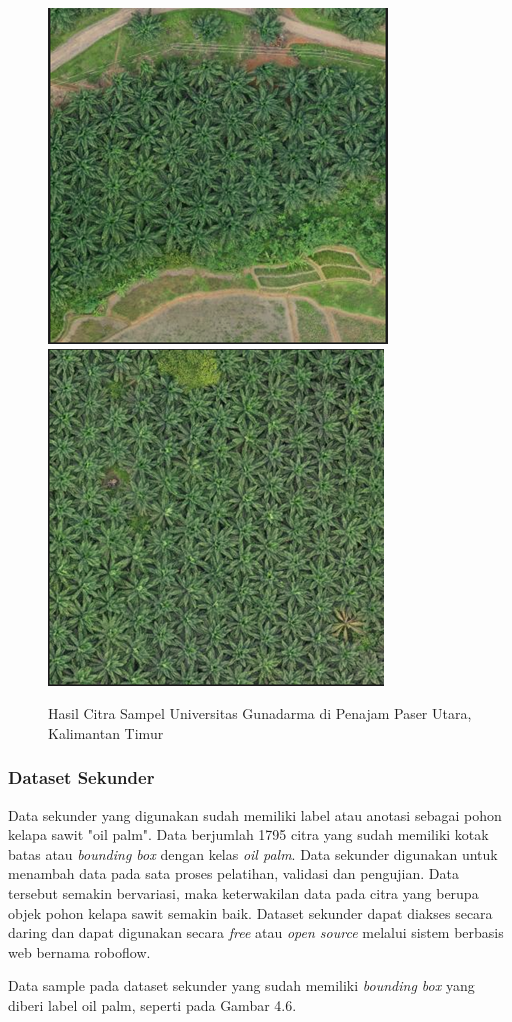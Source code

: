 \begin{figure}[H]
	\vspace{-0.1cm}
	\begin{center}
		\includegraphics[width=0.6\columnwidth]{bab4/Gambar/Picture5.1.png}
		\hspace{1cm}
		\includegraphics[width=0.6\columnwidth]{bab4/Gambar/Picture5.2.png}
	\end{center}
	\vspace{-0.2cm}
	\captionsetup{justification=centering}
	\caption{Hasil Citra Sampel Universitas Gunadarma di Penajam Paser Utara, Kalimantan Timur}\label{img:Hasil-Citra-Sampel-Universitas-Gunadarma-2}
\end{figure}

\subsubsection{Dataset Sekunder}
\hspace{1,2cm}
Data sekunder yang digunakan sudah memiliki label atau anotasi sebagai pohon kelapa sawit "oil palm". Data berjumlah 1795 citra yang sudah memiliki kotak batas atau \textit{bounding box} dengan kelas \textit{oil palm}. Data sekunder digunakan untuk menambah data pada sata proses pelatihan, validasi dan pengujian. Data tersebut semakin bervariasi, maka keterwakilan data pada citra yang berupa objek pohon kelapa sawit semakin baik. Dataset sekunder dapat diakses secara daring dan dapat digunakan secara \textit{free} atau \textit{open source} melalui sistem berbasis web bernama roboflow.

Data sample pada dataset sekunder yang sudah memiliki \textit{bounding box} yang diberi label oil palm, seperti pada Gambar 4.6.

